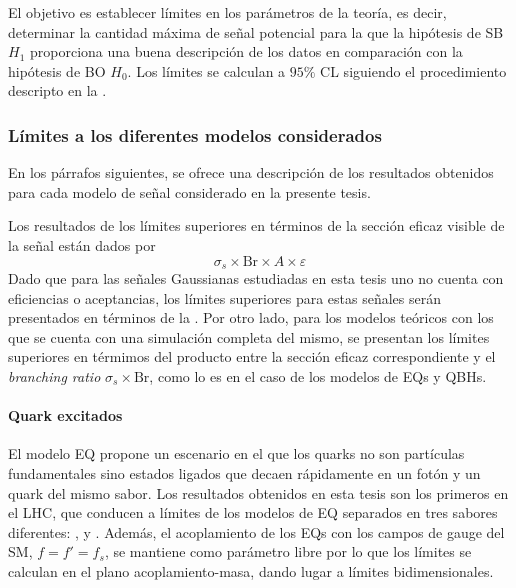 El objetivo es establecer límites en los parámetros de la teoría, es decir, determinar la cantidad máxima de señal potencial para la que la hipótesis de \ac{SB} \(H_1\) proporciona una buena descripción de los datos en comparación con la hipótesis de \ac{BO} \(H_0\). Los límites se calculan a \(95\%\) \ac{CL} siguiendo el procedimiento descripto en la \Sect{\ref{subsec:strategy:stat_treatment:hypo_test}}.


\subsubsection{Límites a los diferentes modelos considerados}
\label{subsubsec:results:results:bkgsig:results}

En los párrafos siguientes, se ofrece una descripción de los resultados obtenidos para cada modelo de señal considerado en la presente tesis.

Los resultados de los límites superiores en términos de la sección eficaz visible de la señal están dados por
\begin{equation}
    \label{eq:results:results:bkgsig:results:visible_xs}
    \sigma_s \times \text{Br} \times A \times \varepsilon
\end{equation}
Dado que para las señales Gaussianas estudiadas en esta tesis uno no cuenta con eficiencias o aceptancias, los límites superiores para estas señales serán presentados en términos de la \Eqn{\ref{eq:results:results:bkgsig:results:visible_xs}}. Por otro lado, para los modelos teóricos con los que se cuenta con una simulación completa del mismo, se presentan los límites superiores en térmimos del producto entre la sección eficaz correspondiente y el \textit{branching ratio} \(\sigma_s \times \text{Br}\), como lo es en el caso de los modelos de \acp{EQ} y \acp{QBH}.


\paragraph{Quark excitados}
\label{paragraph:results:results:bkgsig:results:qstar}

El modelo \ac{EQ} propone un escenario en el que los quarks no son partículas fundamentales sino estados ligados que decaen rápidamente en un fotón y un quark del mismo sabor. Los resultados obtenidos en esta tesis son los primeros en el \ac{LHC}, que conducen a límites de los modelos de \ac{EQ} separados en tres sabores diferentes: \qstar, \cstar y \bstar.
Además, el acoplamiento de los \acp{EQ} con los campos de gauge del \ac{SM}, \(f=f'=f_s\), se mantiene como parámetro libre por lo que los límites se calculan en el plano acoplamiento-masa, dando lugar a límites bidimensionales.


